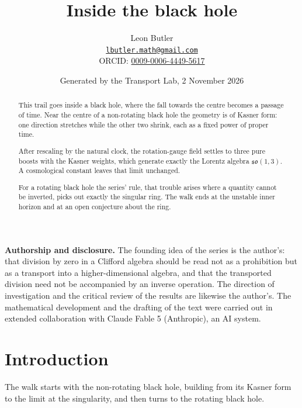 \documentclass[11pt]{article}
\title{\bfseries Inside the black hole}
\author{Leon Butler\\ \normalsize\href{mailto:lbutler.math@gmail.com}{\texttt{lbutler.math@gmail.com}}\\ \normalsize ORCID: \href{https://orcid.org/0009-0006-4449-5617}{0009-0006-4449-5617}}
\date{Generated by the Transport Lab, 2 November 2026}
\theoremstyle{definition}
\theoremstyle{plain}
\begin{document}
\maketitle
\begin{abstract}
\normalsize
This trail goes inside a black hole, where the fall towards the centre becomes a passage of time. Near the centre of a non-rotating black hole the geometry is of Kasner form: one direction stretches while the other two shrink, each as a fixed power of proper time.

After rescaling by the natural clock, the rotation-gauge field settles to three pure boosts with the Kasner weights, which generate exactly the Lorentz algebra $\mathfrak{so}(1,3)$. A cosmological constant leaves that limit unchanged.

For a rotating black hole the series' rule, that trouble arises where a quantity cannot be inverted, picks out exactly the singular ring. The walk ends at the unstable inner horizon and at an open conjecture about the ring.
\end{abstract}
\newpage
\noindent \textbf{Authorship and disclosure. }The founding idea of the series is the author's: that division by zero in a Clifford algebra should be read not as a prohibition but as a transport into a higher-dimensional algebra, and that the transported division need not be accompanied by an inverse operation. The direction of investigation and the critical review of the results are likewise the author's. The mathematical development and the drafting of the text were carried out in extended collaboration with Claude Fable 5 (Anthropic), an AI system.

\noindent{}
\newpage

\section*{Introduction}
The walk starts with the non-rotating black hole, building from its Kasner form to the limit at the singularity, and then turns to the rotating black hole.
\end{document}
